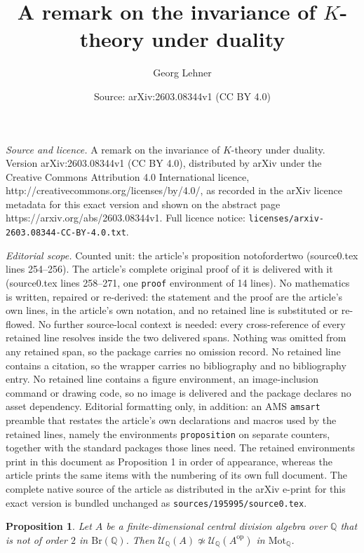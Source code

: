 \documentclass[10pt,a4paper]{amsart}
\title{A remark on the invariance of $K$-theory under duality}
\author{Georg Lehner}
\date{Source: arXiv:2603.08344v1 (CC BY 4.0)}
\newtheorem{proposition}{Proposition}
\newcommand{\op}{\mathrm{op}}
\begin{document}
\maketitle

\noindent\emph{Source and licence.} A remark on the invariance of $K$-theory under duality. Version arXiv:2603.08344v1 (CC BY 4.0), distributed by arXiv under the Creative Commons Attribution 4.0 International licence, http://creativecommons.org/licenses/by/4.0/, as recorded in the arXiv licence metadata for this exact version and shown on the abstract page https://arxiv.org/abs/2603.08344v1. Full licence notice: \texttt{licenses/arxiv-2603.08344-CC-BY-4.0.txt}.\par\smallskip

\noindent\textit{Editorial scope.} Counted unit: the article's proposition notofordertwo (source0.tex lines 254--256). The article's complete original proof of it is delivered with it (source0.tex lines 258--271, one \texttt{proof} environment of 14 lines). No mathematics is written, repaired or re-derived: the statement and the proof are the article's own lines, in the article's own notation, and no retained line is substituted or re-flowed.  No further source-local context is needed: every cross-reference of every retained line resolves inside the two delivered spans.  Nothing was omitted from any retained span, so the package carries no omission record.  No retained line contains a citation, so the wrapper carries no bibliography and no bibliography entry.  No retained line contains a figure environment, an image-inclusion command or drawing code, so no image is delivered and the package declares no asset dependency.  Editorial formatting only, in addition: an AMS \texttt{amsart} preamble that restates the article's own declarations and macros used by the retained lines, namely the environments \texttt{proposition} on separate counters, together with the standard packages those lines need.  The retained environments print in this document as Proposition 1 in order of appearance, whereas the article prints the same items with the numbering of its own full document.  The complete native source of the article as distributed in the arXiv e-print for this exact version is bundled unchanged as \texttt{sources/195995/source0.tex}.
\begin{proposition} \label{notofordertwo}
Let $A$ be a finite-dimensional central division algebra over $\mathbb{Q}$ that is not of order $2$ in $\mathrm{Br}(\mathbb{Q})$. Then $\mathcal{U}_\mathbb{Q}(A) \not\simeq \mathcal{U}_\mathbb{Q}(A^{\op})$ in $\mathrm{Mot}_\mathbb{Q}$.
\end{proposition}
\end{document}
